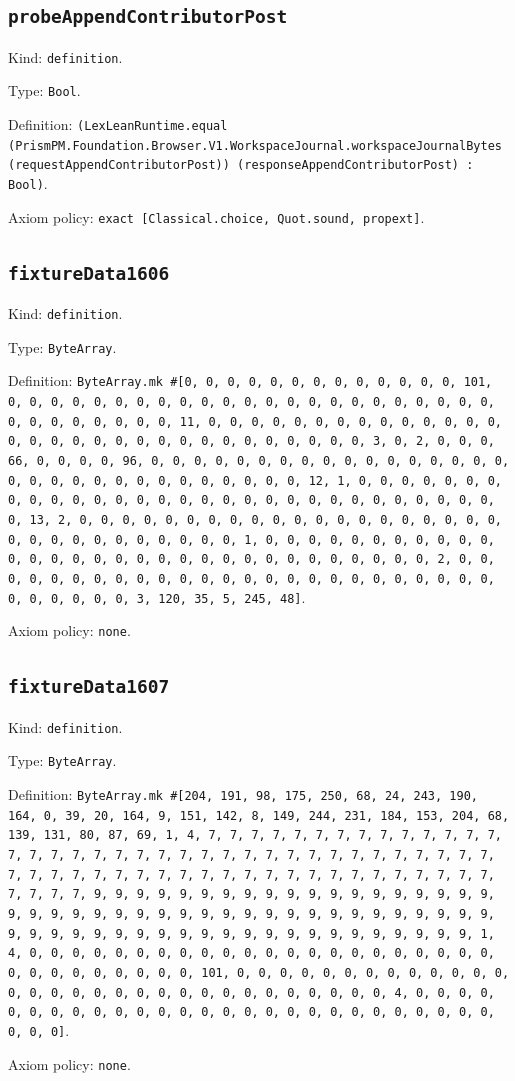 \documentclass[11pt]{article}
\begin{document}
\subsection*{\texttt{probeAppendContributorPost}}
\noindent Kind: \texttt{definition}.\par
\noindent Type: \texttt{Bool}.\par
\noindent Definition: \texttt{(LexLeanRuntime.equal (PrismPM.Foundation.Browser.V1.WorkspaceJournal.workspaceJournalBytes (requestAppendContributorPost)) (responseAppendContributorPost) : Bool)}.\par
\noindent Axiom policy: \texttt{exact [Classical.choice, Quot.sound, propext]}.\par
\subsection*{\texttt{fixtureData1606}}
\noindent Kind: \texttt{definition}.\par
\noindent Type: \texttt{ByteArray}.\par
\noindent Definition: \texttt{ByteArray.mk \#[0, 0, 0, 0, 0, 0, 0, 0, 0, 0, 0, 0, 0, 101, 0, 0, 0, 0, 0, 0, 0, 0, 0, 0, 0, 0, 0, 0, 0, 0, 0, 0, 0, 0, 0, 0, 0, 0, 0, 0, 0, 0, 0, 0, 0, 11, 0, 0, 0, 0, 0, 0, 0, 0, 0, 0, 0, 0, 0, 0, 0, 0, 0, 0, 0, 0, 0, 0, 0, 0, 0, 0, 0, 0, 0, 0, 0, 3, 0, 2, 0, 0, 0, 66, 0, 0, 0, 0, 96, 0, 0, 0, 0, 0, 0, 0, 0, 0, 0, 0, 0, 0, 0, 0, 0, 0, 0, 0, 0, 0, 0, 0, 0, 0, 0, 0, 0, 0, 0, 0, 12, 1, 0, 0, 0, 0, 0, 0, 0, 0, 0, 0, 0, 0, 0, 0, 0, 0, 0, 0, 0, 0, 0, 0, 0, 0, 0, 0, 0, 0, 0, 0, 0, 13, 2, 0, 0, 0, 0, 0, 0, 0, 0, 0, 0, 0, 0, 0, 0, 0, 0, 0, 0, 0, 0, 0, 0, 0, 0, 0, 0, 0, 0, 0, 0, 0, 1, 0, 0, 0, 0, 0, 0, 0, 0, 0, 0, 0, 0, 0, 0, 0, 0, 0, 0, 0, 0, 0, 0, 0, 0, 0, 0, 0, 0, 0, 0, 0, 2, 0, 0, 0, 0, 0, 0, 0, 0, 0, 0, 0, 0, 0, 0, 0, 0, 0, 0, 0, 0, 0, 0, 0, 0, 0, 0, 0, 0, 0, 0, 0, 3, 120, 35, 5, 245, 48]}.\par
\noindent Axiom policy: \texttt{none}.\par
\subsection*{\texttt{fixtureData1607}}
\noindent Kind: \texttt{definition}.\par
\noindent Type: \texttt{ByteArray}.\par
\noindent Definition: \texttt{ByteArray.mk \#[204, 191, 98, 175, 250, 68, 24, 243, 190, 164, 0, 39, 20, 164, 9, 151, 142, 8, 149, 244, 231, 184, 153, 204, 68, 139, 131, 80, 87, 69, 1, 4, 7, 7, 7, 7, 7, 7, 7, 7, 7, 7, 7, 7, 7, 7, 7, 7, 7, 7, 7, 7, 7, 7, 7, 7, 7, 7, 7, 7, 7, 7, 7, 7, 7, 7, 7, 7, 7, 7, 7, 7, 7, 7, 7, 7, 7, 7, 7, 7, 7, 7, 7, 7, 7, 7, 7, 7, 7, 7, 7, 7, 7, 7, 7, 7, 9, 9, 9, 9, 9, 9, 9, 9, 9, 9, 9, 9, 9, 9, 9, 9, 9, 9, 9, 9, 9, 9, 9, 9, 9, 9, 9, 9, 9, 9, 9, 9, 9, 9, 9, 9, 9, 9, 9, 9, 9, 9, 9, 9, 9, 9, 9, 9, 9, 9, 9, 9, 9, 9, 9, 9, 9, 9, 9, 9, 9, 9, 9, 9, 1, 4, 0, 0, 0, 0, 0, 0, 0, 0, 0, 0, 0, 0, 0, 0, 0, 0, 0, 0, 0, 0, 0, 0, 0, 0, 0, 0, 0, 0, 0, 0, 0, 101, 0, 0, 0, 0, 0, 0, 0, 0, 0, 0, 0, 0, 0, 0, 0, 0, 0, 0, 0, 0, 0, 0, 0, 0, 0, 0, 0, 0, 0, 0, 0, 4, 0, 0, 0, 0, 0, 0, 0, 0, 0, 0, 0, 0, 0, 0, 0, 0, 0, 0, 0, 0, 0, 0, 0, 0, 0, 0, 0, 0, 0, 0]}.\par
\noindent Axiom policy: \texttt{none}.\par
\end{document}
